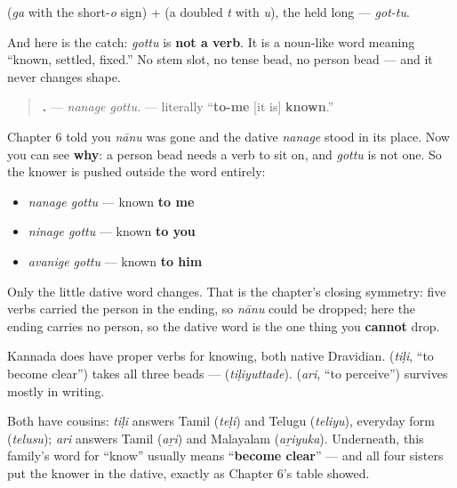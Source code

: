 \textbf{} (\emph{ga} with the short-\emph{o} sign) + \textbf{} (a doubled \emph{t} with \emph{u}), the \textbf{} held long — \emph{got-tu}.

And here is the catch: \emph{gottu} is \textbf{not a verb}. It is a noun-like word meaning \textquotedblleft{}known, settled, fixed.\textquotedblright{} No stem slot, no tense bead, no person bead — and it never changes shape.

\begin{quote}
\textbf{ .} — \emph{nanage gottu.} — literally \textquotedblleft{}\textbf{to-me} {[}it is{]} \textbf{known}.\textquotedblright{}
\end{quote}

\begin{grammarlens}[title={Grammar Lens: no person slot, so the person moves out}]
Chapter 6 told you \emph{nānu} was gone and the dative \emph{nanage} stood in its place. Now you can see \textbf{why}: a person bead needs a verb to sit on, and \emph{gottu} is not one. So the knower is pushed outside the word entirely:

\begin{itemize}
\raggedright
  \item \emph{nanage gottu} — known \textbf{to me}
  \item \emph{ninage gottu} — known \textbf{to you}
  \item \emph{avanige gottu} — known \textbf{to him}
\end{itemize}

Only the little dative word changes. That is the chapter's closing symmetry: five verbs carried the person in the ending, so \emph{nānu} could be dropped; here the ending carries no person, so the dative word is the one thing you \textbf{cannot} drop.
\end{grammarlens}

\begin{cousinweb}
Kannada does have proper verbs for knowing, both native Dravidian. \textbf{} (\emph{tiḷi}, \textquotedblleft{}to become clear\textquotedblright{}) takes all three beads — \textbf{} (\emph{tiḷiyuttade}). \textbf{} (\emph{ari}, \textquotedblleft{}to perceive\textquotedblright{}) survives mostly in writing.

Both have cousins: \emph{tiḷi} answers Tamil \textbf{} (\emph{teḷi}) and Telugu \textbf{} (\emph{teliyu}), everyday form \textbf{} (\emph{telusu}); \emph{ari} answers Tamil \textbf{} (\emph{aṟi}) and Malayalam \textbf{} (\emph{aṟiyuka}). Underneath, this family's word for \textquotedblleft{}know\textquotedblright{} usually means \textquotedblleft{}\textbf{become clear}\textquotedblright{} — and all four sisters put the knower in the dative, exactly as Chapter 6's table showed.
\end{cousinweb}

